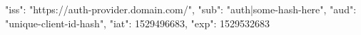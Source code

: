 {
  "iss": "https://auth-provider.domain.com/",
  "sub": "auth|some-hash-here",
  "aud": "unique-client-id-hash",
  "iat": 1529496683,
  "exp": 1529532683
}